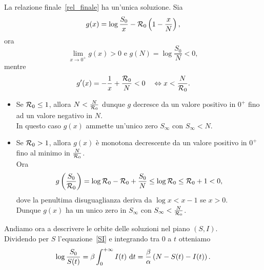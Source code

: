 \begin{prop}
La relazione finale~\eqref{rel_finale}  ha un'unica soluzione.
\proof 
Sia 
$$ g(x) =\log \frac{S_0}{x} -\mathcal R_0 \left(  1 -\frac{x}{N} \right), $$
ora 
$$\lim_{x\to 0^+} g(x)>0 \text{  e }  g(N) =\log\frac{S_0}{N} < 0, $$ 
mentre
$$g'(x)=-\frac{1}{x} + \frac{\mathcal R_0}{N} < 0\quad \Leftrightarrow x < \frac{N}{\mathcal R_0}. $$
\begin{itemize}
	\item Se $\mathcal R_0\leq 1 $,   allora $N < \frac{N}{\mathcal R_0}$ dunque $g$ decresce da un valore positivo in $0^+$  fino ad un valore negativo in $N$.\\
	In questo caso  $g(x)$ ammette un'unico zero   $S_\infty$ con $S_\infty< N $.
	\item Se $\mathcal R_0 >1$, allora $g(x)$ \`e monotona decrescente da un valore positivo in $0^+$ fino al minimo in $\frac{N}{\mathcal R_0}$.\\
Ora
$$ g\left(  \frac{S_0}{\mathcal R_0} \right) =\log \mathcal R_0 - \mathcal R_0 +\frac{S_0}{N}\leq \log \mathcal R_0 \leq  \mathcal R_0 + 1 <0,$$
dove la penultima disuguaglianza deriva da $\log x < x - 1$ se $x>0$.\\
Dunque $g(x)$ ha un unico zero in $S_\infty$ con $S_\infty< \frac{N}{\mathcal R_0}$.
\end{itemize}
\endproof	
\end{prop}

\vspace{0.5 cm}

Andiamo ora a descrivere le orbite delle soluzioni nel piano $(S,I)$.\\
Dividendo per $S$  l'equazione~\eqref{SI} e integrando tra $0$ a $t$ otteniamo 
$$ \log \frac{S_0}{S(t)} =\beta \int_0^{+\infty } I(t) \,\,\mathrm{d} t = \frac{\beta}{\alpha} \left(  N- S(t) - I(t) \right).$$ 
\newpage

